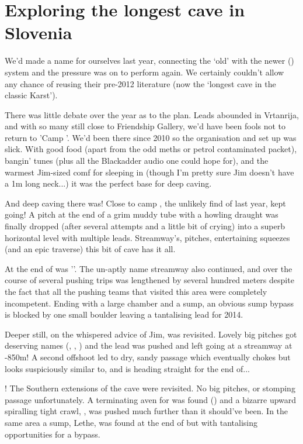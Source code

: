 
\section{Exploring the longest cave in Slovenia}

We’d made a name for ourselves last year, connecting the ‘old’  with the newer  () system and the pressure was on to perform again. We certainly couldn’t allow  any chance of reusing their pre-2012 literature (now the ‘longest cave in the classic Karst’). 

There was little debate over the year as to the plan. Leads abounded in Vrtanrija, and with so many still close to Friendship Gallery, we’d have been fools not to return to 'Camp '. We’d been there since 2010 so the organisation and set up was slick. With good food (apart from the odd meths or petrol contaminated packet), bangin’ tunes (plus all the Blackadder audio one could hope for), and the warmest Jim-sized comf for sleeping in (though I’m pretty sure Jim doesn’t have a 1m long neck...) it was the perfect base for deep caving.

And deep caving there was! Close to camp , the unlikely find of last year, kept going! A pitch at the end of a grim muddy tube with a howling draught was finally dropped (after several attempts and a little bit of crying) into a superb horizontal level with multiple leads. Streamway’s, pitches, entertaining squeezes (and an epic traverse) this bit of cave has it all.

At the end of  was ''. The un-aptly name streamway also continued, and over the course of several pushing trips was lengthened by several hundred meters despite the fact that all the pushing teams that visited this area were completely incompetent. Ending with a large chamber and a sump, an obvious sump bypass is blocked by one small boulder leaving a tantalising lead for 2014.

Deeper still, on the whispered advice of Jim,  was revisited. Lovely big pitches got deserving names (, , ) and the lead was pushed and left going at a streamway at -850m! A second offshoot led to dry, sandy passage which eventually chokes but looks suspiciously similar to, and is heading straight for the end of...

! The Southern extensions of the cave were revisited. No big pitches, or stomping passage unfortunately. A terminating aven for  was found () and a bizarre upward spiralling tight crawl, , was pushed much further than it should’ve been. In the same area a sump, Lethe, was found at the end of  but with tantalising opportunities for a bypass.

